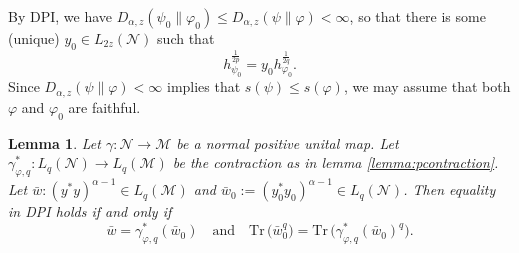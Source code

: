 \documentclass[12pt]{article}
\newtheorem{lemma}[theorem]{Lemma}
\theoremstyle{definition}
\theoremstyle{remark}
\numberwithin{equation}{section}
\def\Me{\mathcal M}
\def\Ne{\mathcal N}
\def \Tr{\mathrm{Tr}\,}
\def\ffi{\varphi}
\begin{document}
By DPI, we have $D_{\alpha,z}(\psi_0\|\varphi_0)\le D_{\alpha,z}(\psi\|\varphi)<\infty$,
so that there is some (unique) $y_0\in L_{2z}(\Ne)$ such that 
\[
h_{\psi_0}^{\frac1{2p}}=y_0h_{\varphi_0}^{\frac1{2q}}.
\]
Since $D_{\alpha,z}(\psi\|\ffi)<\infty$ implies that $s(\psi)\le s(\ffi)$, we may assume that both $\ffi$ and $\ffi_0$ are faithful.


\begin{lemma}\label{lemma:le} Let $\gamma:\Ne\to\Me$ be a normal positive unital map. 
Let $\gamma^*_{\ffi,q}:L_q(\Ne)\to L_q(\Me)$ be the contraction as in lemma \ref{lemma:pcontraction}. 
Let $\bar w:(y^*y)^{\alpha-1}\in L_q(\Me)$ and $\bar w_0:=(y_0^*y_0)^{\alpha-1}\in
L_q(\Ne)$. Then equality in DPI holds if and only if
\begin{equation}\label{eq:dpiw}
\bar w=\gamma^*_{\ffi,q}(\bar w_0)\quad \text{and}\quad  
\Tr \bigl(\bar w_0^q\bigr)=\Tr \bigl(\gamma^*_{\varphi,q}(\bar w_0)^q\bigr).
\end{equation}


\end{lemma}
\end{document}
